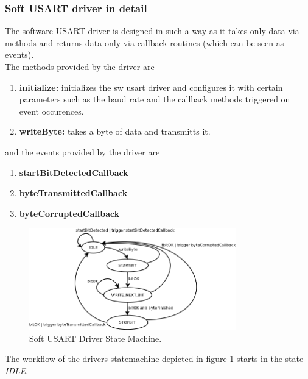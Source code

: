 \subsubsection{Soft USART driver in detail}
\label{sec:bus:design:layer1:interface:swuart}

The software USART driver is designed in such a way as it takes only data via methods and returns data only via callback routines (which can be seen as events).\\

The methods provided by the driver are

\begin{enumerate}
 \item \textbf{initialize: } initializes the sw usart driver and configures it with certain parameters such as the baud rate and the callback methods triggered on event occurences.
 \item \textbf{writeByte: } takes a byte of data and transmitts it.
\end{enumerate}

and the events provided by the driver are

\begin{enumerate}
 \item \textbf{startBitDetectedCallback}
 \item \textbf{byteTransmittedCallback}
 \item \textbf{byteCorruptedCallback}
\end{enumerate}

\begin{figure}[h]
\centering
\includegraphics[width=0.8\textwidth]{../images/swuart_statemachine.png}
\caption{Soft USART Driver State Machine.}
\label{fig:bus:design:layer1:interface:swuart}
\end{figure}

The workflow of the drivers statemachine depicted in figure \ref{fig:bus:design:layer1:interface:swuart} starts in the state \textit{IDLE}.\\

